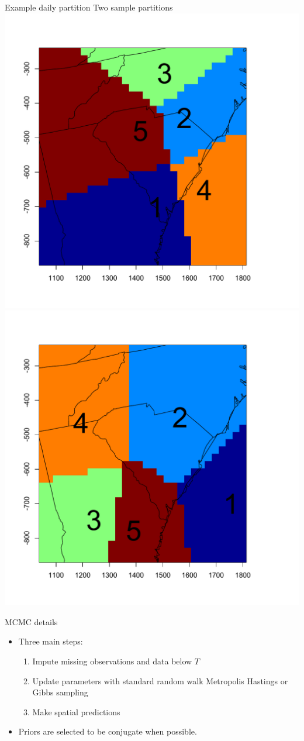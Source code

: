 \documentclass{beamer}
\begin{document}
\begin{frame}{Example daily partition}
	Two sample partitions
    \centering
    \includegraphics[width=0.54\linewidth]{./plots/example-partition-1.pdf}
    \includegraphics[width=0.54\linewidth]{./plots/example-partition-2.pdf}
\end{frame}

\begin{frame}{MCMC details}
  \begin{itemize} \setlength{\itemsep}{0.5em}
    \item Three main steps:
    \begin{enumerate}[1.]
      \item Impute missing observations and data below $T$
      \item Update parameters with standard random walk Metropolis Hastings or Gibbs sampling
      \item Make spatial predictions
    \end{enumerate}
    \item Priors are selected to be conjugate when possible.
  \end{itemize}
\end{frame}
\end{document}
